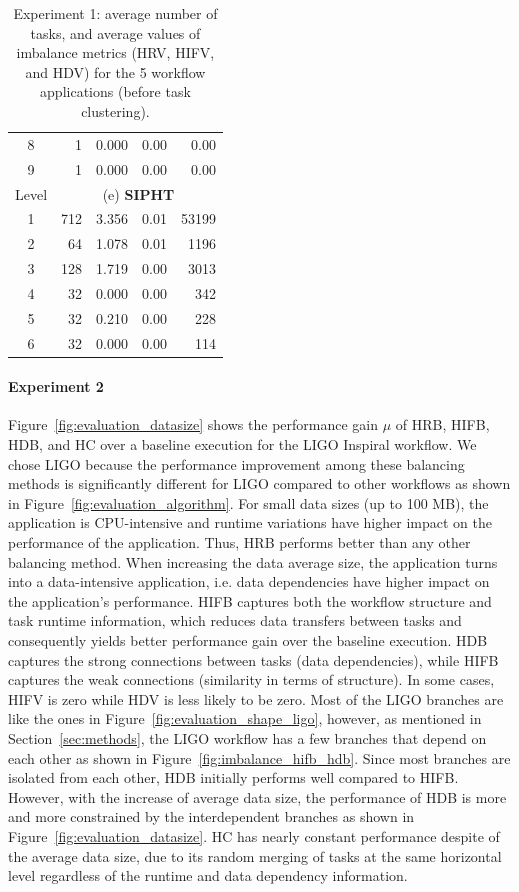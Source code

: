 \documentclass[final,5p,times,twocolumn]{elsarticle}
\begin{document}
\begin{table}[!htb]
\begin{tabular}{c|r|r|r|r}
		8 &1 & 0.000 & 0.00 & 0.00 \\
		9 & 1 & 0.000 & 0.00 & 0.00 \\
		\hline		
		Level & \multicolumn{4}{c}{(e) \textbf{SIPHT}} \\
		\hline
		1 & 712 & 3.356 & 0.01 & 53199 \\
		2 & 64 & 1.078 & 0.01 & 1196 \\
		3 & 128 & 1.719 & 0.00 & 3013 \\
		4 & 32 & 0.000 & 0.00 & 342 \\
		5 & 32 & 0.210 & 0.00 & 228\\
		6& 32 & 0.000 & 0.00 & 114\\
	\end{tabular}
	\caption{Experiment 1: average number of tasks, and average values of imbalance metrics (HRV, HIFV, and HDV) for the 5 workflow applications (before task clustering).}
	\label{tab:evaluation_montage}
\end{table} 


\paragraph{\textbf{Experiment 2}} 
Figure~\ref{fig:evaluation_datasize} shows the performance gain $\mu$ of HRB, HIFB, HDB, and HC over a baseline execution for the LIGO Inspiral workflow. We chose LIGO because the performance improvement among these balancing methods is significantly different for LIGO compared to other workflows as shown in Figure~\ref{fig:evaluation_algorithm}. For small data sizes (up to 100 MB), the application is CPU-intensive and runtime variations have higher impact on the performance of the application. Thus, HRB performs better than any other balancing method. When increasing the data average size, the application turns into a data-intensive application, i.e. data dependencies have higher impact on the application's performance. HIFB captures both the workflow structure and task runtime information, which reduces data transfers between tasks and consequently yields better performance gain over the baseline execution. HDB captures the strong connections between tasks (data dependencies), while HIFB captures the weak connections (similarity in terms of structure). In some cases, HIFV is zero while HDV is less likely to be zero.
Most of the LIGO branches are like the ones in Figure~\ref{fig:evaluation_shape_ligo}, however, as mentioned in Section~\ref{sec:methods}, the LIGO workflow has a few branches that depend on each other as shown in Figure~\ref{fig:imbalance_hifb_hdb}. Since most branches are isolated from each other, HDB initially performs well compared to HIFB. However, with the increase of average data size, the performance of HDB is more and more constrained by the interdependent branches as shown in Figure~\ref{fig:evaluation_datasize}.  
HC has nearly constant performance despite of the average data size, due to its random merging of tasks at the same horizontal level regardless of the runtime and data dependency information.
\end{document}
